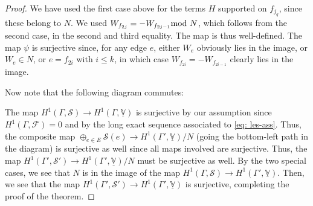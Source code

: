 \documentclass{article}
\theoremstyle{definition}
\theoremstyle{remark}
\begin{document}
\begin{proof}
We have used the first case above for the terms $H$ supported on $f_{j_{q}}$, since these belong to $N.$ We used $W_{f_{2j}} = -W_{f_{2j -1}} \textup{mod } N$, which follows from the second case, in the second and third equality. The map is thus well-defined. The map $\psi$ is surjective since, for any edge $e$, either $W_{e}$ obviously lies in the image, or $W_{e} \in N$, or $e=f_{2i}$ with $i\leq k$, in which case $W_{f_{2i}} = -W_{f_{2i -1}}$ clearly lies in the image.

Now note that the following diagram commutes:
\begin{figure}[h!]
    \centering
{}
\end{figure}

The map $H^{1}(\Gamma, \mathcal{S})\rightarrow H^{1}(\Gamma, \underline{\mathbb{V}})$ is surjective by our assumption since $H^{1}(\Gamma, \mathcal{F}) = 0$ and by the long exact sequence associated to \eqref{eq: les-ass}. Thus, the composite map $\oplus_{e \in E} \mathcal{S}(e) \rightarrow H^{1}(\Gamma', \underline{\mathbb{V}})/N$ (going the bottom-left path in the diagram) is surjective as well since all maps involved are surjective. Thus, the map $H^{1}(\Gamma', \mathcal{S}') \rightarrow  H^{1}(\Gamma', \underline{\mathbb{V}})/ N$ must be surjective as well. By the two special cases, we see that $N$ is in the image of the map $H^{1}(\Gamma, \mathcal{S}) \rightarrow H^{1}(\Gamma', \underline{\mathbb{V}})$. Then, we see that the map $H^{1}(\Gamma', \mathcal{S}') \rightarrow H^{1}(\Gamma', \underline{\mathbb{V}})$ is surjective, completing the proof of the theorem.
\end{proof}
\end{document}
